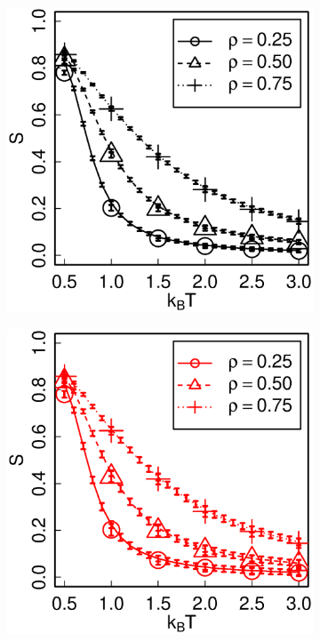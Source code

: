 \begin{figure}[h]
\centering
\begin{subfigure}[t]{0.49\textwidth}
	\centering
	\includegraphics[width=\textwidth]{Images/op_eq_6400}
\end{subfigure}
\begin{subfigure}[t]{0.49\textwidth}
	\centering
	\includegraphics[width=\textwidth]{Images/op_eq_1600}
\end{subfigure}


\end{figure}

